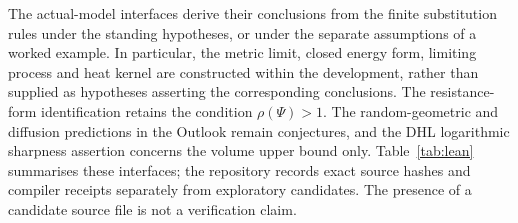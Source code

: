 \documentclass{article}
\theoremstyle{plain}
\theoremstyle{definition}
\begin{document}
The actual-model interfaces derive their conclusions from the finite substitution rules under the standing hypotheses, or under the separate assumptions of a worked example.
In particular, the metric limit, closed energy form, limiting process and heat kernel are constructed within the development, rather than supplied as hypotheses asserting the corresponding conclusions.
The resistance-form identification retains the condition $\rho(\Psi)>1$.
The random-geometric and diffusion predictions in the Outlook remain conjectures, and the DHL logarithmic sharpness assertion concerns the volume upper bound only.
Table~\ref{tab:lean} summarises these interfaces; the repository records exact source hashes and compiler receipts separately from exploratory candidates.
The presence of a candidate source file is not a verification claim.
\end{document}
